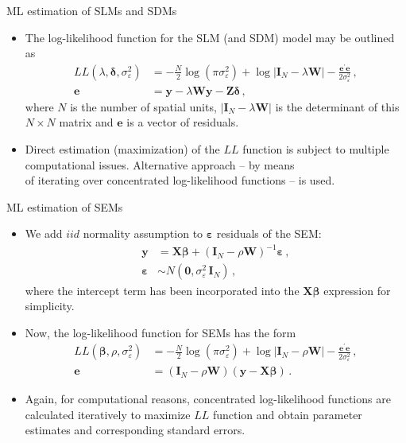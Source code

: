 \documentclass{beamer}
\begin{document}
\begin{frame}{ML estimation of SLMs and SDMs}
\begin{itemize}
    \item The log-likelihood function for the SLM (and SDM) model may be outlined as
    \begin{equation*}
    \begin{aligned}
    LL(\lambda,\bm{\delta}, \sigma_{\varepsilon}^2) &= - \frac{N}{2} \log (\pi \sigma_{\varepsilon}^2) +
    \log | \bm{I}_{N} - \lambda \bm{W} | - 
    \frac{\bm{e}^{'} \bm{e} }{2\sigma_{\varepsilon}^2}\,, \\
    \bm{e} &= \bm{y} - \lambda \bm{Wy} - \bm{Z \delta}\,,
    \end{aligned}
    \end{equation*}
    where $N$ is the number of spatial units, $| \bm{I}_{N} - \lambda \bm{W} |$ is the determinant of this $N \! \times \! N$ matrix and $\bm{e}$ is a vector of residuals.
    \smallskip
    \item Direct estimation (maximization) of the $LL$ function is subject to multiple computational issues. Alternative approach -- by means \\of iterating over concentrated log-likelihood functions -- is used.
\end{itemize}
\end{frame}
\begin{frame}{ML estimation of SEMs}
\begin{itemize}
    \item We add $\textit{iid}$ normality assumption to $\bm{\varepsilon}$ residuals of the SEM:
    \begin{equation*}
    \begin{aligned}
    \bm{y} &= \bm{X \beta} +  (\bm{I}_{N} - \rho \bm{W})^{-1} \bm{\varepsilon}\,, \\ 
    \bm{\varepsilon} &\sim N(\bm{0}, \sigma_{\varepsilon}^2\,\bm{I}_{N})\,,
    \end{aligned}
    \end{equation*}
    where the intercept term has been incorporated into the $\bm{X \beta}$ expression for simplicity. 
    \smallskip
    \item Now, the log-likelihood function for SEMs has the form
    \begin{equation*}
    \begin{aligned}
    LL(\bm{\beta}, \rho, \sigma_{\varepsilon}^2) &= - \frac{N}{2} \log (\pi \sigma_{\varepsilon}^2) +
    \log | \bm{I}_{N} - \rho \bm{W} | - 
    \frac{\bm{e}^{'} \bm{e} }{2\sigma_{\varepsilon}^2}\,, \\
    \bm{e} &= (\bm{I}_{N} - \rho \bm{W}) (\bm{y} - \bm{X \beta})\,.
    \end{aligned}
    \end{equation*}
    \item Again, for computational reasons, concentrated log-likelihood functions are calculated iteratively to maximize $LL$ function and obtain parameter estimates and corresponding standard errors. 
\end{itemize}
\end{frame}
\end{document}
